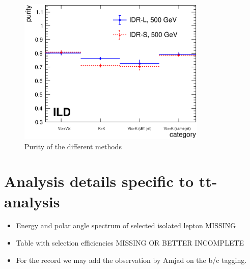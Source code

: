 \documentclass[preprint]{elsarticle}
\begin{document}
\begin{figure}[h!]
\centering
  \includegraphics[width=0.8\textwidth]{figures_BBbar/purity_v2.eps} 
\caption{Purity of the different methods}
\label{purity_bb}
\end{figure}

\section{Analysis details specific to tt-analysis}

\begin{itemize}
\item Energy and polar angle spectrum of selected isolated lepton MISSING
\item Table with selection efficiencies MISSING OR BETTER INCOMPLETE
\item For the record we may add the observation by Amjad on the b/c tagging.
\end{itemize}
\end{document}
